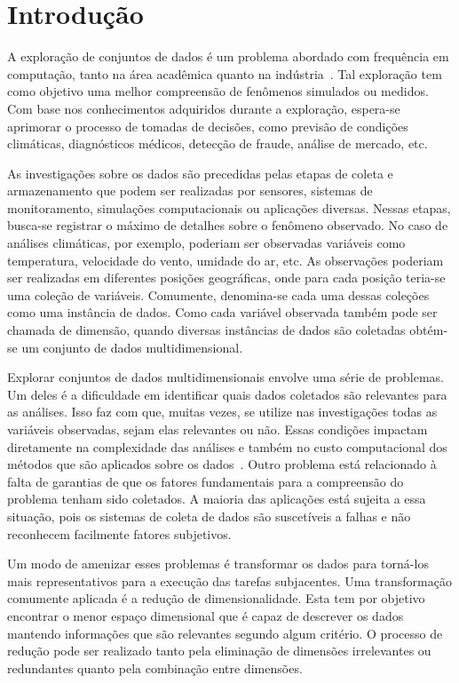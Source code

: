 \chapter{Introdução}

A exploração de conjuntos de dados é um problema abordado
com frequência em computação, tanto na área acadêmica quanto
na indústria~\cite{Ngai2009,Harding2006}. Tal exploração tem
como objetivo uma melhor compreensão de fenômenos simulados
ou medidos. Com base nos conhecimentos adquiridos durante a
exploração, espera-se aprimorar o processo de tomadas de
decisões, como previsão de condições climáticas,
diagnósticos médicos, detecção de fraude, análise de
mercado, etc.

As investigações sobre os dados são precedidas pelas etapas
de coleta e armazenamento que podem ser realizadas por
sensores, sistemas de monitoramento, simulações
computacionais ou aplicações diversas. Nessas etapas,
busca-se registrar o máximo de detalhes sobre o fenômeno
observado. No caso de análises climáticas, por exemplo,
poderiam ser observadas variáveis como temperatura,
velocidade do vento, umidade do ar, etc.  As observações
poderiam ser realizadas em diferentes posições geográficas,
onde para cada posição teria-se uma coleção de variáveis.
Comumente, denomina-se cada uma dessas coleções como uma
instância de dados.  Como cada variável observada também
pode ser chamada de dimensão, quando diversas instâncias de
dados são coletadas obtém-se um conjunto de dados
multidimensional. 

Explorar conjuntos de dados multidimensionais envolve uma
série de problemas. Um deles é a dificuldade em identificar
quais dados coletados são relevantes para as análises. Isso
faz com que, muitas vezes, se utilize nas investigações
todas as variáveis observadas, sejam elas relevantes ou não.
Essas condições impactam diretamente na complexidade das
análises e também no custo computacional dos métodos que são
aplicados sobre os dados~\cite{Beyer1999}. Outro
problema está relacionado à falta de garantias de que os
fatores fundamentais para a compreensão do problema tenham
sido coletados. A maioria das aplicações está sujeita a essa
situação, pois os sistemas de coleta de dados são
suscetíveis a falhas e não reconhecem facilmente fatores
subjetivos. 

Um modo de amenizar esses problemas é transformar os dados
para torná-los mais representativos para a execução das
tarefas subjacentes. Uma transformação comumente aplicada
é a redução de dimensionalidade. Esta tem
por objetivo encontrar o menor espaço dimensional que é
capaz de descrever os dados mantendo informações que são
relevantes segundo algum critério. O processo de redução
pode ser realizado tanto pela eliminação de dimensões
irrelevantes ou redundantes quanto pela combinação entre
dimensões. 

